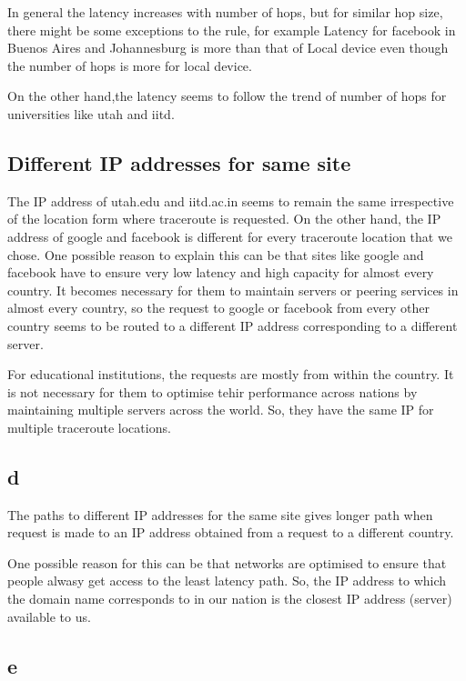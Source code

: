 \documentclass{article}
\begin{document}
In general the latency increases with number of hops, but for similar hop size, there might be some exceptions to the rule, for example 
Latency for facebook in Buenos Aires and Johannesburg is more than that of Local device even though the number of hops is more for local device.

On the other hand,the latency seems to follow the trend of number of hops for universities like utah and iitd.

\subsection*{Different IP addresses for same site}

The IP address of utah.edu and iitd.ac.in seems to remain the same irrespective of the location form where traceroute is requested.
On the other hand, the IP address of google and facebook is different for every traceroute location that we chose.
One possible reason to explain this can be that sites like google and facebook have to ensure very low latency and high capacity for
almost every country. It becomes necessary for them to maintain servers or peering services in almost every country, so the request to 
google or facebook from every other country seems to be routed to a different IP address corresponding to a different server.

For educational institutions, the requests are mostly from within the country. It is not necessary for them to optimise tehir 
performance across nations by maintaining multiple servers across the world. So, they have the same IP for multiple traceroute
locations.

\subsection*{d}

The paths to different IP addresses for the same site gives longer path when request is made to an IP address obtained from a request 
to a different country. 

One possible reason for this can be that networks are optimised to ensure that people alwasy get access to the least latency path. So,
the IP address to which the domain name corresponds to in our nation is the closest IP address (server) available to us.

\subsection*{e}
\end{document}
